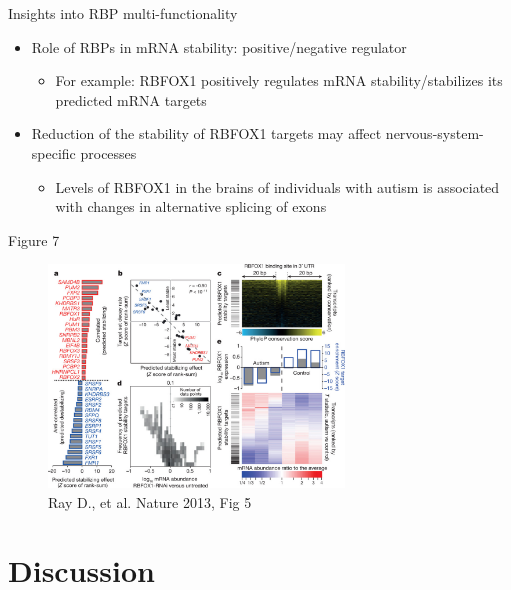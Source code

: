 \documentclass[professionalfont, 12pt, default]{beamer}
\providecommand{\tightlist}{%
    \setlength{\itemsep}{0pt}\setlength{\parskip}{0pt}}
\begin{document}
\begin{frame}{Insights into RBP multi-functionality}

\begin{itemize}
\tightlist
\item
  Role of RBPs in mRNA stability: positive/negative regulator

  \begin{itemize}
  \tightlist
  \item
    For example: RBFOX1 positively regulates mRNA stability/stabilizes
    its predicted mRNA targets
  \end{itemize}
\item
  Reduction of the stability of RBFOX1 targets may affect
  nervous-system-specific processes

  \begin{itemize}
  \tightlist
  \item
    Levels of RBFOX1 in the brains of individuals with autism is
    associated with changes in alternative splicing of exons
  \end{itemize}
\end{itemize}

\end{frame}

\begin{frame}{Figure 7}

\begin{figure}
\centering
\includegraphics[width=0.70000\textwidth]{img/f5.jpg}
\caption{Ray D., et al. Nature 2013, Fig 5}
\end{figure}

\end{frame}

\section{Discussion}\label{discussion}
\end{document}
